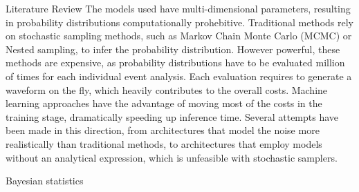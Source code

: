 \documentclass[a4paper, 12pt, twoside, openright, titlepage]{book}
\begin{document}
\begin{chapter}{Literature Review}
The models used have multi-dimensional parameters, resulting in probability distributions computationally prohebitive. 
Traditional methods rely on stochastic sampling methods, such as Markov Chain Monte Carlo (MCMC) or Nested sampling, to infer the probability distribution.
However powerful, these methods are expensive, as probability distributions have to be evaluated million of times for each individual event analysis. 
Each evaluation requires to generate a waveform on the fly, which heavily contributes to the overall costs.
Machine learning approaches have the advantage of moving most of the costs in the training stage, dramatically speeding up inference time.
Several attempts have been made in this direction, from architectures that model the noise more realistically than traditional methods, to architectures that employ models without an analytical expression, which is unfeasible with stochastic samplers.

\begin{comment}
(nothing technical: that comes later)
- one uses bayesian stat to analyze individual events
- one uses hierarchical to analyze populations
- an alternative approach is simulation based inference
- advantages for individual events
- advantages for populations
\end{comment}

\begin{section}{Bayesian statistics}


\end{section}
\end{chapter}
\end{document}
